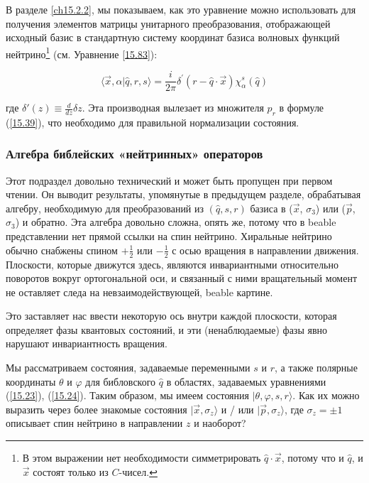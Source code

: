 \documentclass[main.tex]{subfiles}
\begin{document}
В разделе \ref{ch15.2.2}, мы показываем, как это уравнение можно использовать для получения элементов матрицы унитарного преобразования, отображающей исходный базис в стандартную систему координат базиса волновых функций нейтрино\footnote{В этом выражении нет необходимости симметрировать $\hat q\cdot \vec x$, потому что и $\hat q$, и $\vec x$ состоят только из $C$-чисел.} (см. Уравнение \ref{15.83}):

\begin{equation}\label{15.40}
	\langle\vec{x}, \alpha | \hat{q}, r, s\rangle=\frac{i}{2 \pi} \delta^{\prime}(r-\hat{q} \cdot \vec{x}) \chi_{\alpha}^{s}(\hat{q})
\end{equation}

где $\delta\prime(z) \equiv \frac{d}{dz}\delta z$. Эта производная вылезает из множителя $p_r$ в формуле (\ref{15.39}), что необходимо для правильной нормализации состояния.

\subsubsection{Алгебра библейских «нейтринных» операторов}\label{ch15.2.1}

Этот подраздел довольно технический и может быть пропущен при первом чтении. Он выводит результаты, упомянутые в предыдущем разделе, обрабатывая алгебру, необходимую для преобразований из $(\hat q, s, r)$ базиса в ($\vec x$, $\sigma_3$) или ($\vec p$, $\sigma_3$) и обратно. Эта алгебра довольно сложна, опять же, потому что в beable представлении нет прямой ссылки на спин нейтрино. Хиральные нейтрино обычно снабжены спином $+\frac 1 2$ или $-\frac 1 2$ с осью вращения в направлении движения. Плоскости, которые движутся здесь, являются инвариантными относительно поворотов вокруг ортогональной оси, и связанный с ними вращательный момент не оставляет следа на невзаимодействующей, beable картине.

Это заставляет нас ввести некоторую ось внутри каждой плоскости, которая определяет фазы квантовых состояний, и эти (ненаблюдаемые) фазы явно нарушают инвариантность вращения.

Мы рассматриваем состояния, задаваемые переменными $s$ и $r$, а также полярные координаты $\theta$ и $\varphi$ для библовского $\hat q$ в областях, задаваемых уравнениями (\ref{15.23}), (\ref{15.24}). Таким образом, мы имеем состояния $|\theta,\varphi, s, r\rangle$. Как их можно выразить через более знакомые состояния $|\vec x,\sigma_z\rangle$ и / или $|\vec p,\sigma_z\rangle$, где $\sigma_z = \pm 1$ описывает спин нейтрино в направлении $z$ и наоборот?
\end{document}
